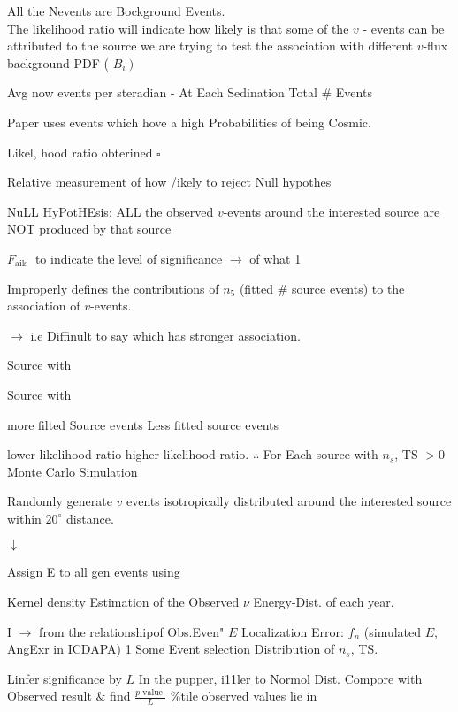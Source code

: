 \documentclass[journal,12pt,twocolumn]{IEEEtran}
\begin{document}
All the Nevents are Bockground Events.\\

The likelihood ratio will indicate how likely is that some of the $v$ - events can be attributed to the source we are trying to test the association with different $v$-flux background PDF ( $\left.B_{i}\right)$

Avg now events per steradian - At Each Sedination Total # Events

Paper uses events which hove a high Probabilities of being Cosmic.

Likel, hood ratio obterined $\square$

Relative measurement of how /ikely to reject Null hypothes

NuLL HyPotHEsis: ALL the observed $v$-events around the interested source are NOT produced
by that source

$F_{\text {ails }}$ to indicate the level of significance $\rightarrow$ of what 1

Improperly defines the contributions of $n_{5}$ (fitted # source events) to the association of $v$-events.

$\rightarrow$ i.e Diffinult to say which has stronger association.

Source with

Source with

more filted Source events Less fitted source events

lower likelihood ratio higher likelihood ratio. $\therefore$ For Each source with $n_{s}$, TS $>0$ Monte Carlo Simulation

Randomly generate $v$ events isotropically distributed around the interested source within $20^{\circ}$ distance.

$\downarrow$

Assign E to all gen events using

Kernel density Estimation of the Observed $\nu$ Energy-Dist. of each year.

I $\rightarrow$ from the relationshipof Obs.Even" $E$ Localization Error: $f_{n}$ (simulated $E$, AngExr in ICDAPA) 1 Some Event selection Distribution of $n_{s}$, TS.

Linfer significance by $L$ In the pupper, i11ler to Normol Dist. Compore with Observed result \& find $\frac{p \text {-value }}{L}$ \%tile observed values lie in
\end{document}
